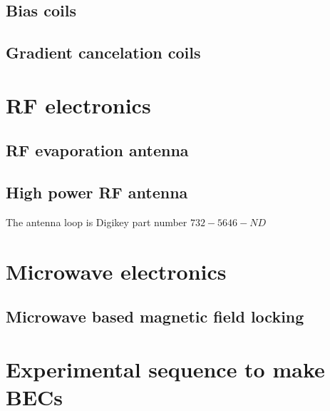 \subsection{Bias coils}
\subsection{Gradient cancelation coils}

\section{RF electronics}
\subsection{RF evaporation antenna}
\subsection{High power RF antenna}
The antenna loop is Digikey part number $732-5646-ND$

\section{Microwave electronics}

\subsection{Microwave based magnetic field locking}

\section{Experimental sequence to make BECs}

